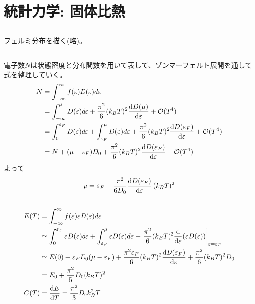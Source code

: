 \documentclass[../ap_2010.tex]{subfiles}
\begin{document}
\chapter{統計力学: 固体比熱}
\section{}
フェルミ分布を描く(略)。
\section{}
電子数\(N\)は状態密度と分布関数を用いて表して、ゾンマーフェルト展開を通して式を整理していく。
\begin{equation}\begin{aligned}[b]
    N &= \int_{-\infty}^{\infty}f(\varepsilon)D(\varepsilon)d\varepsilon\\
    &= \int_{-\infty}^{\mu}D(\varepsilon)d\varepsilon + \frac{\pi^2}{6}(k_BT)^2\dv{D(\mu)}{\varepsilon}+\mathcal{O}(T^4)\\
    &= \int_{0}^{\varepsilon_F}D(\varepsilon)d\varepsilon
    +\int_{\varepsilon_F}^{\mu}D(\varepsilon)d\varepsilon
    + \frac{\pi^2}{6}(k_BT)^2\dv{D(\varepsilon_F)}{\varepsilon}+\mathcal{O}(T^4)\\
    &= N  +(\mu-\varepsilon_F)D_0+ \frac{\pi^2}{6}(k_BT)^2\dv{D(\varepsilon_F)}{\varepsilon}+\mathcal{O}(T^4)
\end{aligned}\end{equation}
よって
\begin{equation}\begin{aligned}[b]
    \mu = \varepsilon_F- \frac{\pi^2}{6D_0}\dv{D(\varepsilon_F)}{\varepsilon}\,(k_BT)^2
\end{aligned}\end{equation}

\section{}
\begin{equation}\begin{aligned}[b]
    E(T) &= \int_{-\infty}^{\infty}f(\varepsilon)\varepsilon D(\varepsilon)d\varepsilon\\
    &\simeq \int_{0}^{\varepsilon_F}\varepsilon D(\varepsilon)d\varepsilon
    +\int_{\varepsilon_F}^{\mu}\varepsilon D(\varepsilon)d\varepsilon
    +\left.\frac{\pi^2}{6}(k_BT)^2\dv{\varepsilon}\qty(\varepsilon D(\varepsilon))\right|_{\varepsilon=\varepsilon_F}\\
    &\simeq E(0)+\varepsilon_FD_0(\mu-\varepsilon_F)+\frac{\pi^2\varepsilon_F}{6}(k_BT)^2\dv{D(\varepsilon_F)}{\varepsilon}+\frac{\pi^2}{6}(k_BT)^2D_0\\
    &= E_0 + \frac{\pi^2}{5}D_0(k_BT)^2\\
    C(T) &= \dv{E}{T}=\frac{\pi^2}{3}D_0k_B^2T
\end{aligned}\end{equation}
\end{document}
